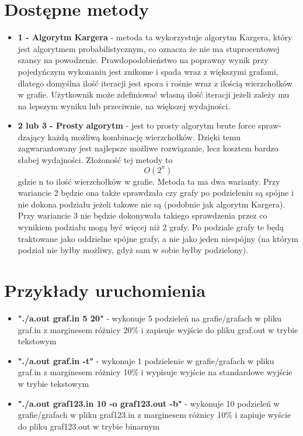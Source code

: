 \documentclass{article}
\begin{document}
\section{Dostępne metody}
\begin{itemize}
    \item \textbf{1 - Algorytm Kargera} - metoda ta wykorzystuje algorytm Kargera, który jest algorytmem probabilistycznym, co oznacza że nie ma stuprocentowej szansy na powodzenie. Prawdopodobieństwo na poprawny wynik przy pojedyńczym wykonaniu jest znikome i spada wraz z większymi grafami, dlatego domyślna ilość iteracji jest spora i rośnie wraz z ilością wierzchołków w grafie. Użytkownik może zdefiniować własną ilość iteracji jeżeli zależy mu na lepszym wyniku lub przeciwnie, na większej wydajności.
    \item \textbf{2 lub 3 - Prosty algorytm} - jest to prosty algorytm brute force spraw- dzający każdą możliwą kombinację wierzchołków. Dzięki temu zagwarantowany jest najlepsze możliwe rozwiązanie, lecz kosztem bardzo słabej wydajności. Złożoność tej metody to \[O(2^n)\] gdzie n to ilość wierzchołków w grafie. Metoda ta ma dwa warianty. Przy wariancie 2 będzie ona także sprawdzała czy grafy po podzieleniu są spójne i nie dokona podziału jeżeli takowe nie są (podobnie jak algorytm Kargera). Przy wariancie 3 nie będzie dokonywała takiego sprawdzenia przez co wynikiem podziału mogą być więcej niż 2 grafy. Po podziale grafy te będą traktowane jako oddzielne spójne grafy, a nie jako jeden niespójny (na którym podział nie byłby możliwy, gdyż sam w sobie byłby podzielony).
\end{itemize}
\section{Przykłady uruchomienia}
\begin{itemize}
\item \textbf{"./a.out graf.in 5 20"} - wykonuje 5 podzieleń na grafie/grafach w pliku graf.in z marginesem różnicy 20\% i zapisuje wyjście do pliku graf.out w trybie tekstowym
\item
 \textbf{"./a.out graf.in -t"} - wykonuje 1 podzielenie w grafie/grafach w pliku graf.in z marginesem różnicy 10\% i wypisuje wyjście na standardowe wyjście w trybie tekstowym
 \item \textbf{"./a.out graf123.in 10 -o graf123.out -b"} - wykonuje 10 podzieleń w grafie/grafach w pliku graf123.in z marginesem różnicy 10\% i zapiuje wyście do pliku graf123.out w trybie binarnym
 \end{itemize}
\end{document}
